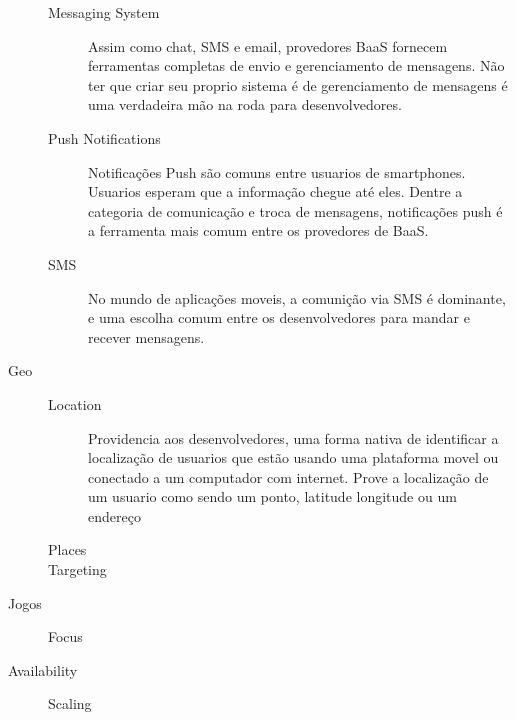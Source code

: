 \begin{description}
\begin{description}
				\item[Messaging System] { Assim como chat, SMS e email, provedores BaaS fornecem ferramentas completas de envio e gerenciamento de mensagens. Não ter que criar seu proprio sistema é de gerenciamento de mensagens é uma verdadeira mão na roda para desenvolvedores.}
				
				\item[Push Notifications] { Notificações Push são comuns entre usuarios de smartphones. Usuarios esperam que a informação chegue até eles. Dentre a categoria de comunicação e troca de mensagens, notificações push é a ferramenta mais comum entre os provedores de BaaS.}

				\item[SMS] { No mundo de aplicações moveis, a comunição via SMS é dominante, e uma escolha comum entre os desenvolvedores para mandar e recever mensagens.}
			\end{description}
		
		\item[Geo]
			\begin{description}
				\item[]
                \item[Location] { Providencia aos desenvolvedores, uma forma nativa de identificar a localização de usuarios que estão usando uma plataforma movel ou conectado a um computador com internet. Prove a localização de um usuario como sendo um ponto, latitude longitude ou um endereço}
				
				\item[Places] {}
				
				\item[Targeting] {}
			\end{description}
		
		\item[Jogos]
			\begin{description}
				\item[]
                \item[Focus] {}
			\end{description}

		\item[Availability]
			\begin{description}
				\item[]
                \item[Scaling] {}
			\end{description}


\end{description}
